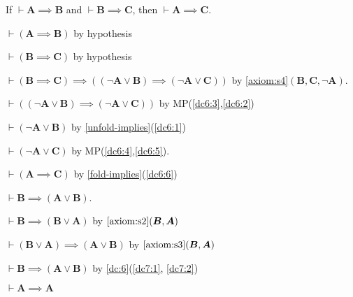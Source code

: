 \documentclass{amsart}%
\newcommand\metavariable[1]{\boldsymbol{#1}}
\begin{document}
\begin{dc}\label{dc:6}
If $\vdash\metavariable{A}\implies\metavariable{B}$
and $\vdash\metavariable{B}\implies\metavariable{C}$,
then $\vdash\metavariable{A}\implies\metavariable{C}$.
\end{dc}

\begin{pf}
\item\label{dc6:1} $\vdash(\metavariable{A}\implies\metavariable{B})$
  by hypothesis
\item\label{dc6:2} $\vdash(\metavariable{B}\implies\metavariable{C})$
  by hypothesis
\item\label{dc6:3} $\vdash(\metavariable{B}\implies\metavariable{C})\implies((\neg\metavariable{A}\lor\metavariable{B})\implies(\neg\metavariable{A}\lor\metavariable{C}))$
  by \ref{axiom:s4}$(\metavariable{B},\metavariable{C},\neg\metavariable{A})$.
\item\label{dc6:4} $\vdash((\neg\metavariable{A}\lor\metavariable{B})\implies(\neg\metavariable{A}\lor\metavariable{C}))$
  by MP(\ref{dc6:3},\ref{dc6:2})
\item\label{dc6:5} $\vdash(\neg\metavariable{A}\lor\metavariable{B})$
  by \ref{unfold-implies}(\ref{dc6:1})
\item\label{dc6:6} $\vdash(\neg\metavariable{A}\lor\metavariable{C})$ by MP(\ref{dc6:4},\ref{dc6:5}).
\item\label{dc6:7} $\vdash(\metavariable{A}\implies\metavariable{C})$ by \ref{fold-implies}(\ref{dc6:6})
\end{pf}

\begin{dc}\label{dc:7}
$\vdash\metavariable{B}\implies(\metavariable{A}\lor\metavariable{B})$.
\end{dc}

\begin{pf}
\item\label{dc7:1} $\vdash\metavariable{B}\implies(\metavariable{B}\lor\metavariable{A})$
  by $\ref{axiom:s2}(\metavariable{B},\metavariable{A})$
\item\label{dc7:2} $\vdash(\metavariable{B}\lor\metavariable{A})\implies(\metavariable{A}\lor\metavariable{B})$
  by $\ref{axiom:s3}(\metavariable{B},\metavariable{A})$
\item $\vdash\metavariable{B}\implies(\metavariable{A}\lor\metavariable{B})$
  by \ref{dc:6}(\ref{dc7:1}, \ref{dc7:2})
\end{pf}

\begin{dc}\label{dc:8}
$\vdash\metavariable{A}\implies\metavariable{A}$
\end{dc}
\end{document}
